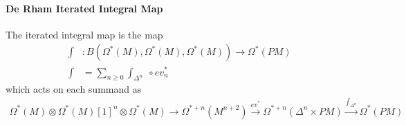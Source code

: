 \documentclass{scrartcl}
\theoremstyle{plain}
\theoremstyle{definition}
\let\xto\xrightarrow
\newcommand{\comp}{\mathbin{\circ}}
\begin{document}
\paragraph{De Rham Iterated Integral Map} The iterated integral map is the map 
\begin{align*}
    \int&\colon B(\Omega^*(M), \Omega^*(M), \Omega^*(M)) \to \Omega^*(PM) \\
    \int&= \sum_{n\geq 0} \int_{\Delta^n}\phantom{|} \comp ev_n^*
\end{align*}
which acts on each summand as 
\begin{align*}
    \Omega^*(M)\otimes\Omega^*(M)[1]^n\otimes\Omega^*(M)\to \Omega^{*+n}(M^{n+2})\xto{ev^*}\Omega^{*+n}(\Delta^n\times PM) \xto{\int_{\Delta^n}} \Omega^{*}(PM)
\end{align*}
\end{document}
